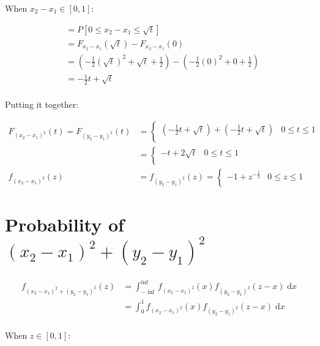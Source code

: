 \documentclass{article}
\newcommand{\dx}{{\; \mathrm{d}x}}
\begin{document}
When $x_2 - x_1 \in [0, 1]$:

\begin{align*}
&= P \left[ 0 \leq x_2 - x_1 \leq \sqrt{t} \right] \\
&= F_{x_2 - x_1}(\sqrt{t}) - F_{x_2 - x_1}(0) \\
&= \left( -\frac{1}{2}(\sqrt{t})^2 + \sqrt{t} + \frac{1}{2} \right) - \left( -\frac{1}{2}(0)^2 + 0 + \frac{1}{2} \right) \\
&= -\frac{1}{2}t + \sqrt{t} \\
\end{align*}

Putting it together:

\begin{align*}
F_{(x_2 - x_1)^2}(t) = F_{(y_2 - y_1)^2}(t)
&=
\begin{cases}
    \left( -\frac{1}{2}t + \sqrt{t} \right)
    + \left( -\frac{1}{2}t + \sqrt{t} \right)
    & 0 \leq t \leq 1 \\
\end{cases}
\\
&=
\begin{cases}
    -t + 2\sqrt{t} & 0 \leq t \leq 1 \\
\end{cases}
\\
f_{(x_2 - x_1)^2}(z) &= f_{(y_2 - y_1)^2}(z) =
\begin{cases}
    -1 + z^{-\frac{1}{2}} & 0 \leq z \leq 1 \\
\end{cases}
\end{align*}

\section{Probability of $(x_2 - x_1)^2 + (y_2 - y_1)^2$}

\begin{align*}
f_{(x_2 - x_1)^2 + (y_2 - y_1)^2}(z)
&= \int_{-\inf}^{\inf} f_{(x_2 - x_1)^2}(x)f_{(y_2 - y_1)^2}(z - x) \dx \\
&= \int_{0}^{1} f_{(x_2 - x_1)^2}(x)f_{(y_2 - y_1)^2}(z - x) \dx \\
\end{align*}

When $z \in [0, 1]$:
\end{document}

